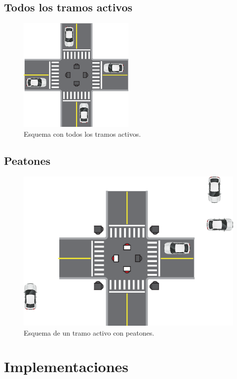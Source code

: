 \subsection{Todos los tramos activos}
\begin{figure}[htbp]
	\centering
	\includegraphics[width=0.5\textwidth]{diagramas/todos-activos.eps}
	\caption{Esquema con todos los tramos activos.}
\end{figure}

\subsection{Peatones}
\begin{figure}[htbp]
	\centering
	\includegraphics[width=1\textwidth]{diagramas/peaton-auto.eps}
	\caption{Esquema de un tramo activo con peatones.}
\end{figure}

\section{Implementaciones}

